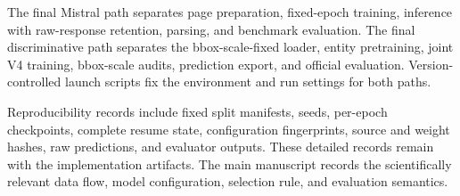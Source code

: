The final Mistral path separates page preparation, fixed-epoch training,
inference with raw-response retention, parsing, and benchmark evaluation. The
final discriminative path separates the bbox-scale-fixed loader, entity
pretraining, joint V4 training, bbox-scale audits, prediction export, and
official evaluation. Version-controlled launch scripts fix the environment and
run settings for both paths.

Reproducibility records include fixed split manifests, seeds, per-epoch
checkpoints, complete resume state, configuration fingerprints, source and
weight hashes, raw predictions, and evaluator outputs. These detailed records
remain with the implementation artifacts. The main manuscript records the
scientifically relevant data flow, model configuration, selection rule, and
evaluation semantics.
